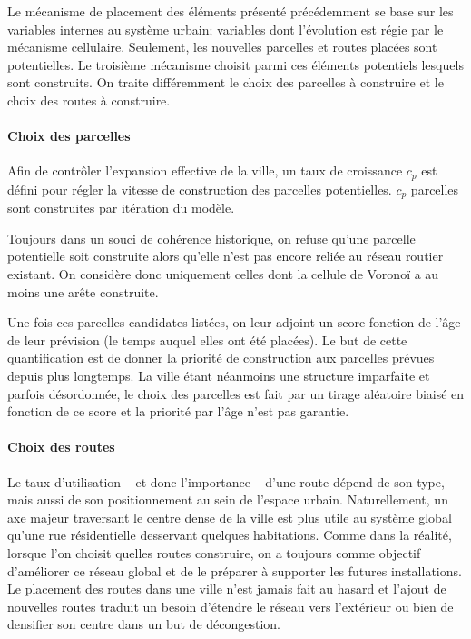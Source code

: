 \documentclass[10pt]{article}
\begin{document}
Le mécanisme de placement des éléments présenté précédemment se base
sur les variables internes au système urbain; variables dont
l'évolution est régie par le mécanisme cellulaire. Seulement, les
nouvelles parcelles et routes placées sont potentielles. Le troisième
mécanisme choisit parmi ces éléments potentiels lesquels sont
construits. On traite différemment le choix des parcelles à construire
et le choix des routes à construire.

\paragraph{Choix des parcelles\\}

Afin de contrôler l'expansion effective de la ville, un taux de
croissance $c_p$ est défini pour régler la vitesse de construction des
parcelles potentielles. $c_p$ parcelles sont construites par itération
du modèle.

Toujours dans un souci de cohérence historique, on refuse qu'une
parcelle potentielle soit construite alors qu'elle n'est pas encore
reliée au réseau routier existant. On considère donc uniquement celles
dont la cellule de Voronoï a au moins une arête construite.

Une fois ces parcelles candidates listées, on leur adjoint un score
fonction de l'âge de leur prévision (le temps auquel elles ont été
placées). Le but de cette quantification est de donner la priorité de
construction aux parcelles prévues depuis plus longtemps. La ville
étant néanmoins une structure imparfaite et parfois désordonnée, le
choix des parcelles est fait par un tirage aléatoire biaisé en
fonction de ce score et la priorité par l'âge n'est pas garantie.

\paragraph{Choix des routes\\}

Le taux d'utilisation -- et donc l'importance -- d'une route dépend de
son type, mais aussi de son positionnement au sein de l'espace
urbain. Naturellement, un axe majeur traversant le centre dense de la
ville est plus utile au système global qu'une rue résidentielle
desservant quelques habitations. Comme dans la réalité, lorsque l'on
choisit quelles routes construire, on a toujours comme objectif
d'améliorer ce réseau global et de le préparer à supporter les futures
installations. Le placement des routes dans une ville n'est jamais
fait au hasard et l'ajout de nouvelles routes traduit un besoin
d'étendre le réseau vers l'extérieur ou bien de densifier son centre
dans un but de décongestion.
\end{document}
